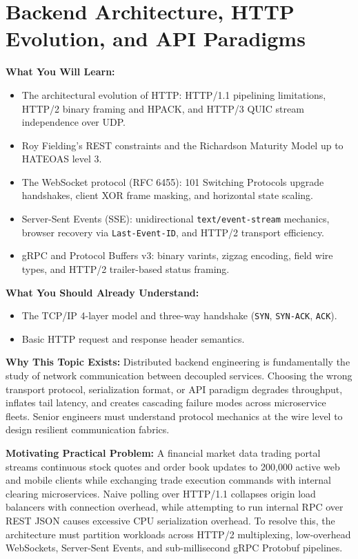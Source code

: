 \chapter{Backend Architecture, HTTP Evolution, and API Paradigms}
\label{chap:backend-arch-http-api}

\begin{chaptergoalsbox}
\textbf{What You Will Learn:}
\begin{itemize}[leftmargin=12pt,itemsep=2pt]
  \item The architectural evolution of HTTP: HTTP/1.1 pipelining limitations, HTTP/2 binary framing and HPACK, and HTTP/3 QUIC stream independence over UDP.
  \item Roy Fielding's REST constraints and the Richardson Maturity Model up to HATEOAS level 3.
  \item The WebSocket protocol (RFC 6455): 101 Switching Protocols upgrade handshakes, client XOR frame masking, and horizontal state scaling.
  \item Server-Sent Events (SSE): unidirectional \texttt{text/event-stream} mechanics, browser recovery via \texttt{Last-Event-ID}, and HTTP/2 transport efficiency.
  \item gRPC and Protocol Buffers v3: binary varints, zigzag encoding, field wire types, and HTTP/2 trailer-based status framing.
\end{itemize}

\textbf{What You Should Already Understand:}
\begin{itemize}[leftmargin=12pt,itemsep=2pt]
  \item The TCP/IP 4-layer model and three-way handshake (\texttt{SYN}, \texttt{SYN-ACK}, \texttt{ACK}).
  \item Basic HTTP request and response header semantics.
\end{itemize}

\textbf{Why This Topic Exists:}
Distributed backend engineering is fundamentally the study of network communication between decoupled services. Choosing the wrong transport protocol, serialization format, or API paradigm degrades throughput, inflates tail latency, and creates cascading failure modes across microservice fleets. Senior engineers must understand protocol mechanics at the wire level to design resilient communication fabrics.

\textbf{Motivating Practical Problem:}
A financial market data trading portal streams continuous stock quotes and order book updates to 200,000 active web and mobile clients while exchanging trade execution commands with internal clearing microservices. Naive polling over HTTP/1.1 collapses origin load balancers with connection overhead, while attempting to run internal RPC over REST JSON causes excessive CPU serialization overhead. To resolve this, the architecture must partition workloads across HTTP/2 multiplexing, low-overhead WebSockets, Server-Sent Events, and sub-millisecond gRPC Protobuf pipelines.
\end{chaptergoalsbox}


